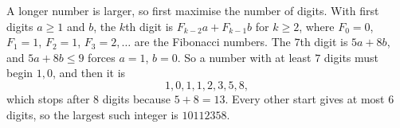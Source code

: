 A longer number is larger, so first maximise the number of digits. With first digits $a\ge1$ and $b$, the $k$th digit is $F_{k-2}a+F_{k-1}b$ for $k\ge2$, where $F_0=0$, $F_1=1$, $F_2=1$, $F_3=2,\dots$ are the Fibonacci numbers. The $7$th digit is $5a+8b$, and $5a+8b\le9$ forces $a=1$, $b=0$. So a number with at least $7$ digits must begin $1,0$, and then it is
\[
1,0,1,1,2,3,5,8,
\]
which stops after $8$ digits because $5+8=13$. Every other start gives at most $6$ digits, so the largest such integer is $\boxed{10112358}$.
